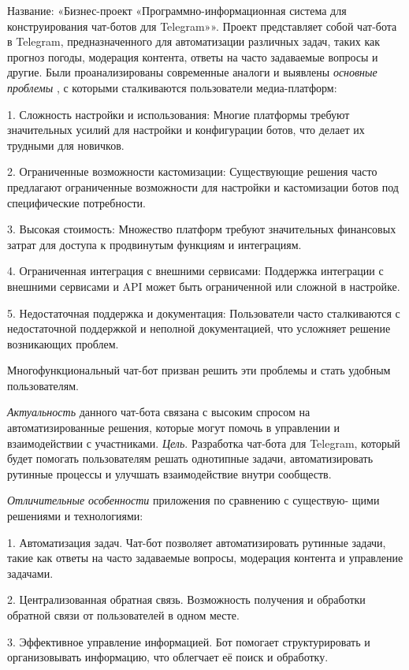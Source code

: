 \newsection
{}
Название: «Бизнес-проект «Программно-информационная система для конструирования чат-ботов для Telegram»».
Проект представляет собой чат-бота в Telegram, предназначенного для автоматизации различных задач, таких как прогноз погоды, модерация контента, ответы на часто задаваемые вопросы и другие.
Были проанализированы современные аналоги и выявлены 
\emph{основные проблемы} , с которыми сталкиваются пользователи медиа-платформ:

1.	Сложность настройки и использования: Многие платформы требуют значительных усилий для настройки и конфигурации ботов, что делает их трудными для новичков.

2.	Ограниченные возможности кастомизации: Существующие решения часто предлагают ограниченные возможности для настройки и кастомизации ботов под специфические потребности.

3.	Высокая стоимость: Множество платформ требуют значительных финансовых затрат для доступа к продвинутым функциям и интеграциям.

4.	Ограниченная интеграция с внешними сервисами: Поддержка интеграции с внешними сервисами и API может быть ограниченной или сложной в настройке.

5.	Недостаточная поддержка и документация: Пользователи часто сталкиваются с недостаточной поддержкой и неполной документацией, что усложняет решение возникающих проблем.

Многофункциональный чат-бот призван решить эти проблемы и стать удобным пользователям.

\emph{Актуальность} данного чат-бота связана с высоким спросом на автоматизированные решения, которые могут помочь в управлении и взаимодействии с участниками.
\emph{Цель}. Разработка чат-бота для Telegram, который будет помогать пользователям решать однотипные задачи, автоматизировать рутинные процессы и улучшать взаимодействие внутри сообществ.

\emph{Отличительные особенности} приложения по сравнению с существую- щими решениями и технологиями:

1.	Автоматизация задач. Чат-бот позволяет автоматизировать рутинные задачи, такие как ответы на часто задаваемые вопросы, модерация контента и управление задачами.

2.	Централизованная обратная связь. Возможность получения и обработки обратной связи от пользователей в одном месте.

3.	Эффективное управление информацией. Бот помогает структурировать и организовывать информацию, что облегчает её поиск и обработку.

